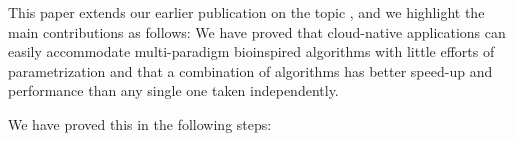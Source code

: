 \documentclass[review]{elsarticle}
\begin{document}


This paper extends our earlier publication on the topic
\cite{guervos2018introducing}, and we highlight the main contributions as
follows:
We have proved that cloud-native applications can easily accommodate multi-paradigm bioinspired algorithms
with little efforts of parametrization and
that a combination of algorithms has better speed-up and performance
than any single one taken independently.

We have proved this in the following steps:
\end{document}
